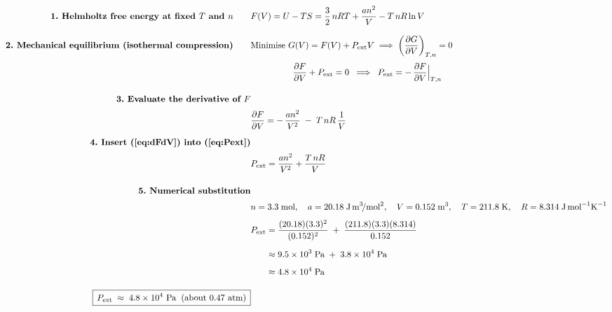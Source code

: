\documentclass[12pt]{article}
\theoremstyle{definition} %
\theoremstyle{plain} %
\begin{document}
        \begin{align}
          \textbf{1.\ Helmholtz free energy at fixed $T$ and $n$} \qquad
            & F(V) = U - TS
                    = \frac{3}{2}\,nRT + \frac{a n^{2}}{V}
                      - T\,nR\ln V                                           \label{eq:F}\\[8pt]
          \textbf{2.\ Mechanical equilibrium (isothermal compression)}\qquad
            &\text{Minimise }G(V)=F(V)+P_{\text{ext}}V
              \;\Longrightarrow\;
              \left(\frac{\partial G}{\partial V}\right)_{T,n}=0\\[2pt]
            &\hspace{1.7cm}
              \frac{\partial F}{\partial V} + P_{\text{ext}} = 0
              \;\;\Longrightarrow\;\;
              P_{\text{ext}} = -\,\frac{\partial F}{\partial V}\Big|_{T,n}     \label{eq:Pext}\\[10pt]
          \textbf{3.\ Evaluate the derivative of $F$} \\[2pt]
            & \frac{\partial F}{\partial V}
                = -\,\frac{a n^{2}}{V^{2}} \;-\; T\,nR\,\frac{1}{V}           \label{eq:dFdV}\\[6pt]
          \textbf{4.\ Insert (\ref{eq:dFdV}) into (\ref{eq:Pext})} \\[2pt]
            & P_{\text{ext}}
                = \frac{a n^{2}}{V^{2}} + \frac{T\,nR}{V}                     \label{eq:Pformula}\\[12pt]
          \textbf{5.\ Numerical substitution} \\[2pt]
            & n = 3.3\;\text{mol}, \quad a = 20.18\;\text{J\,m}^{3}\!/\text{mol}^{2},
              \quad V = 0.152\;\text{m}^{3}, \quad
              T = 211.8\;\text{K}, \quad
              R = 8.314\;\text{J\,mol}^{-1}\text{K}^{-1} \\[4pt]
            & P_{\text{ext}}
                = \frac{(20.18)(3.3)^{2}}{(0.152)^{2}}
                  \;+\;
                  \frac{(211.8)(3.3)(8.314)}{0.152} \\[6pt]
            & \phantom{P_{\text{ext}}}
                \approx 9.5 \times 10^{3}\;\text{Pa}
                  \;+\;
                  3.8 \times 10^{4}\;\text{Pa} \\[4pt]
            & \phantom{P_{\text{ext}}}
                \approx 4.8 \times 10^{4}\;\text{Pa} \\[10pt]
          \boxed{\,P_{\text{ext}} \;\approx\; 4.8 \times 10^{4}\ \text{Pa}
                 \;\;(\text{about } 0.47\ \text{atm})\,}
          \end{align}
          
\end{document}
